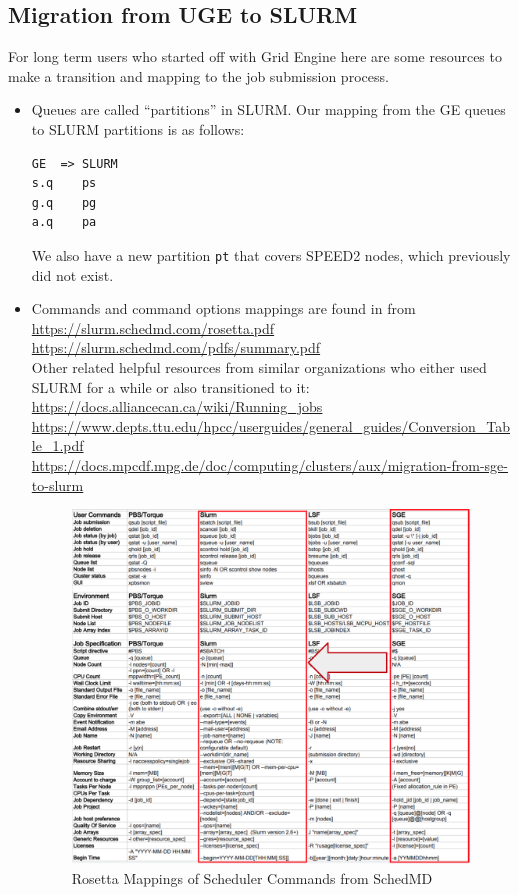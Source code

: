 \documentclass{easychair}
\begin{document}
\subsection{Migration from UGE to SLURM}
\label{appdx:uge-to-slurm}

For long term users who started off with Grid Engine here are some resources
to make a transition and mapping to the job submission process.

\begin{itemize}
\item
Queues are called ``partitions'' in SLURM. Our mapping from the GE queues
to SLURM partitions is as follows:
\begin{verbatim}
GE  => SLURM
s.q    ps
g.q    pg
a.q    pa
\end{verbatim}
We also have a new partition \texttt{pt} that covers SPEED2 nodes,
which previously did not exist.

\item
Commands and command options mappings are found in  from\\
\url{https://slurm.schedmd.com/rosetta.pdf}\\
\url{https://slurm.schedmd.com/pdfs/summary.pdf}\\
Other related helpful resources from similar organizations who either used
SLURM for a while or also transitioned to it:\\
\url{https://docs.alliancecan.ca/wiki/Running_jobs}\\
\url{https://www.depts.ttu.edu/hpcc/userguides/general_guides/Conversion_Table_1.pdf}\\
\url{https://docs.mpcdf.mpg.de/doc/computing/clusters/aux/migration-from-sge-to-slurm}

\begin{figure}[htpb]
	\includegraphics[width=\columnwidth]{images/rosetta-mapping}
	\caption{Rosetta Mappings of Scheduler Commands from SchedMD}
	\label{fig:rosetta-mappings}
\end{figure}


\end{itemize}
\end{document}
